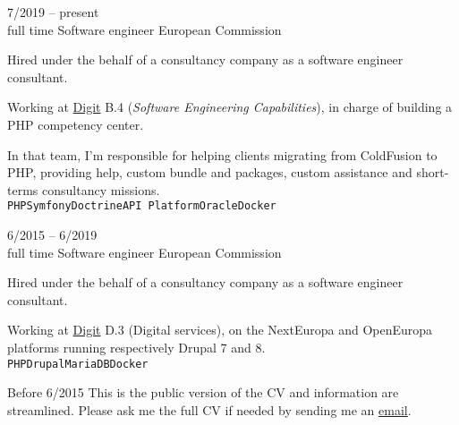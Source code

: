 \begin{entrylist}
	\entry
		{7/2019 -- present\\\footnotesize{full time}}
		{Software engineer}
        {European Commission}
        {
			Hired under the behalf of a consultancy company as a software engineer consultant.

			Working at \href{https://ec.europa.eu/info/departments/informatics_en}{Digit} B.4 (\textit{Software Engineering Capabilities}),
			in charge of building a PHP competency center.

			In that team, I'm responsible for helping clients migrating from ColdFusion to PHP, providing help,
			custom bundle and packages, custom assistance and short-terms consultancy missions.
			\\ \texttt{PHP}\slashsep\texttt{Symfony}\slashsep\texttt{Doctrine}\slashsep\texttt{API Platform}\slashsep\texttt{Oracle}\slashsep\texttt{Docker}
        }
	\entry
		{6/2015 -- 6/2019\\\footnotesize{full time}}
		{Software engineer}
        {European Commission}
        {
			Hired under the behalf of a consultancy company as a software engineer consultant.

			Working at \href{https://ec.europa.eu/info/departments/informatics_en}{Digit} D.3 (Digital services),
			on the NextEuropa and OpenEuropa platforms running respectively Drupal 7 and 8.
			\\ \texttt{PHP}\slashsep\texttt{Drupal}\slashsep\texttt{MariaDB}\slashsep\texttt{Docker}
        }
    \entry
        {\color{black!50}Before 6/2015}
        {}
        {}
        {\footnotesize{\color{black!50}This is the public version of the CV and information are streamlined. Please ask me the full CV if needed by sending me an \href{mailto:pol.dellaiera@protonmail.com}{email}.}}
\end{entrylist}


